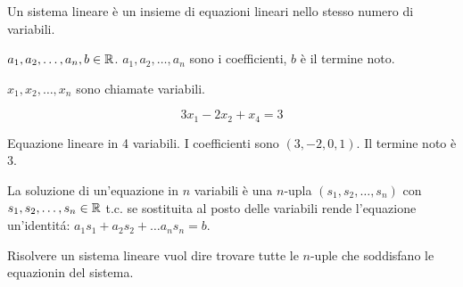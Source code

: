 Un sistema lineare \`e un insieme di equazioni lineari nello stesso numero di variabili.

$a_1, a_2, \dots, a_n, b \in \mathbb{R}$. $a_1, a_2, \dots, a_n$ sono i coefficienti, $b$ \`e il termine noto.

$x_1, x_2, \dots, x_n$ sono chiamate variabili.

\[
3x_1 - 2x_2 + x_4 = 3
\]

Equazione lineare in 4 variabili. I coefficienti sono $(3, -2, 0, 1)$. Il termine noto \`e 3.

La soluzione di un'equazione in $n$ variabili \`e una $n$-upla $(s_1, s_2, \dots, s_n)$ con $s_1, s_2, \dots, s_n \in \mathbb{R}$ t.c. se sostituita al posto delle variabili rende l'equazione un'identit\'a: $a_1 s_1 + a_2 s_2 + \dots a_n s_n = b$.

Risolvere un sistema lineare vuol dire trovare tutte le $n$-uple che soddisfano le equazionin del sistema.

















